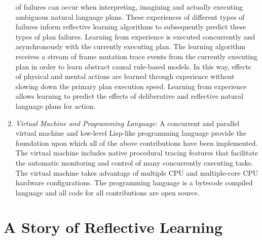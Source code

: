\begin{enumerate}
  of failures can occur when interpreting, imagining and actually
  executing ambiguous natural language plans.  These experiences of
  different types of failures inform reflective learning algorithms to
  subsequently predict these types of plan failures.  Learning from
  experience is executed concurrently and asynchronously with the
  currently executing plan.  The learning algorithm receives a stream
  of frame mutation trace events from the currently executing plan in
  order to learn abstract causal rule-based models.  In this way,
  effects of physical and mental actions are learned through
  experience without slowing down the primary plan execution speed.
  Learning from experience allows learning to predict the effects of
  deliberative and reflective natural language plans for action.
\item \emph{Virtual Machine and Programming Language}: A concurrent
  and parallel virtual machine and low-level Lisp-like programming
  language provide the foundation upon which all of the above
  contributions have been implemented.  The virtual machine includes
  native procedural tracing features that facilitate the automatic
  monitoring and control of many concurrently executing tasks.  The
  virtual machine takes advantage of multiple CPU and multiple-core
  CPU hardware configurations.  The programming language is a bytecode
  compiled language and all code for all contributions are open
  source.
\end{enumerate}

\section{A Story of Reflective Learning}

